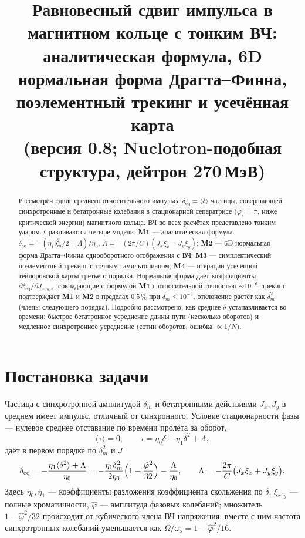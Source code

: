 \documentclass[a4paper,11pt]{article}
\title{Равновесный сдвиг импульса в магнитном кольце с тонким ВЧ:\\
\large аналитическая формула, 6D нормальная форма Драгта--Финна,\\
\large поэлементный трекинг и усечённая карта\\
\normalsize (версия 0.8; Nuclotron-подобная структура, дейтрон 270\,МэВ)}
\author{}\date{}
\newcommand{\deq}{\delta_{\mathrm{eq}}}
\newcommand{\Mone}{\textbf{M1}}\newcommand{\Mtwo}{\textbf{M2}}
\newcommand{\Mthree}{\textbf{M3}}\newcommand{\Mfour}{\textbf{M4}}
\begin{document}
\maketitle

\begin{abstract}
Рассмотрен сдвиг среднего относительного импульса $\deq=\langle\delta\rangle$ частицы, совершающей синхротронные и бетатронные колебания в стационарной сепаратрисе ($\varphi_s=\pi$, ниже критической энергии) магнитного кольца. ВЧ во всех расчётах представлено тонким ударом. Сравниваются четыре модели: \Mone{} --- аналитическая формула $\deq=-(\eta_1\delta_m^2/2+\Lambda)/\eta_0$, $\Lambda=-(2\pi/C)(J_x\xi_x+J_y\xi_y)$; \Mtwo{} --- 6D нормальная форма Драгта--Финна однооборотного отображения с ВЧ; \Mthree{} --- симплектический поэлементный трекинг с точным гамильтонианом; \Mfour{} --- итерации усечённой тейлоровской карты третьего порядка. Нормальная форма даёт коэффициенты $\partial\deq/\partial J_{x,y,s}$, совпадающие с формулой \Mone{} с относительной точностью $\sim10^{-6}$; трекинг подтверждает \Mone{} и \Mtwo{} в пределах $0.5\,\%$ при $\delta_m\le10^{-3}$, отклонение растёт как $\delta_m^2$ (члены следующего порядка). Подробно рассмотрено, как среднее $\delta$ устанавливается во времени: быстрое бетатронное усреднение длины пути (несколько оборотов) и медленное синхротронное усреднение (сотни оборотов, ошибка $\propto 1/N$).
\end{abstract}

\tableofcontents
\clearpage

\section{Постановка задачи}
Частица с синхротронной амплитудой $\delta_m$ и бетатронными действиями $J_x,J_y$ в среднем имеет импульс, отличный от синхронного. Условие стационарности фазы --- нулевое среднее отставание по времени пролёта за оборот,
\begin{equation}\label{eq:tau}
\langle\tau\rangle=0,\qquad \tau=\eta_0\delta+\eta_1\delta^2+\Lambda ,
\end{equation}
даёт в первом порядке по $\delta_m^2$ и $J$
\begin{equation}\label{eq:M1}
\deq=-\frac{\eta_1\langle\delta^2\rangle+\Lambda}{\eta_0}
=-\frac{\eta_1\delta_m^2}{2\eta_0}\Bigl(1-\frac{\hat\varphi^2}{32}\Bigr)-\frac{\Lambda}{\eta_0},
\qquad \Lambda=-\frac{2\pi}{C}\bigl(J_x\xi_x+J_y\xi_y\bigr).
\end{equation}
Здесь $\eta_0,\eta_1$ --- коэффициенты разложения коэффициента скольжения по $\delta$, $\xi_{x,y}$ --- полные хроматичности, $\hat\varphi$ --- амплитуда фазовых колебаний; множитель $1-\hat\varphi^2/32$ происходит от кубического члена ВЧ-напряжения, вместе с ним частота синхротронных колебаний уменьшается как $\Omega/\omega_s=1-\hat\varphi^2/16$.
\end{document}
